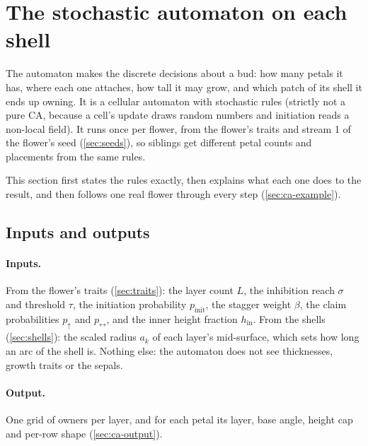 \section{The stochastic automaton on each shell}\label{sec:ca}

The automaton makes the discrete decisions about a bud: how many petals it
has, where each one attaches, how tall it may grow, and which patch of its
shell it ends up owning. It is a cellular automaton with stochastic rules
(strictly not a pure CA, because a cell's update draws random numbers and
initiation reads a non-local field). It runs once per flower, from the
flower's traits and stream 1 of the flower's seed (\cref{sec:seeds}), so
siblings get different petal counts and placements from the same rules.

This section first states the rules exactly, then explains what each one does
to the result, and then follows one real flower through every step
(\cref{sec:ca-example}).

\subsection{Inputs and outputs}
\paragraph{Inputs.} From the flower's traits (\cref{sec:traits}): the layer
count $L$, the inhibition reach $\sigma$ and threshold $\tau$, the initiation
probability $p_{\mathrm{init}}$, the stagger weight $\beta$, the claim
probabilities $p_\uparrow$ and $p_\leftrightarrow$, and the inner height
fraction $h_{\mathrm{in}}$. From the shells (\cref{sec:shells}): the scaled
radius $a_k$ of each layer's mid-surface, which sets how long an arc of the
shell is. Nothing else: the automaton does not see thicknesses, growth traits
or the sepals.

\paragraph{Output.} One grid of owners per layer, and for each petal its
layer, base angle, height cap and per-row shape (\cref{sec:ca-output}).

